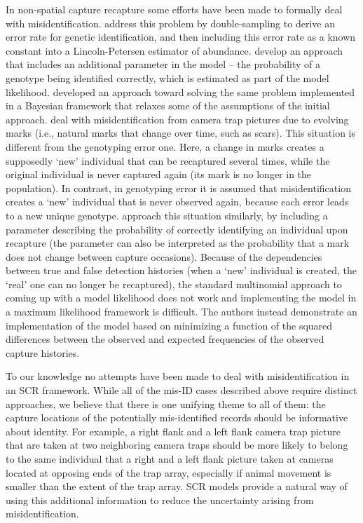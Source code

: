 In non-spatial capture recapture some efforts have been made to
formally deal with misidentification. \citet{stevick_etal:2001}
address this problem by double-sampling to derive an error rate for
genetic identification, and then including this error rate as a known
constant into a Lincoln-Petersen estimator of
abundance. \citet{lukacs_burnham:2005} develop an approach that
includes an additional parameter in the model -- the probability of a
genotype being identified correctly, which is estimated as part of the
model likelihood. \citet{link_etal:2010} developed an approach toward
solving the same problem implemented in a Bayesian framework that
relaxes some of the assumptions of the initial approach.
\citet{yoshizaki_etal:2009} deal with misidentification from camera
trap pictures due to evolving marks (i.e., natural marks that change
over time, such as scars). This situation is different from the
genotyping error one. Here, a change in marks creates a supposedly
`new' individual that can be recaptured several times, while the
original individual is never captured again (its mark is no longer in
the population). In contrast, in genotyping error it is assumed that
misidentification creates a `new' individual that is never observed
again, because each error leads to a new unique
genotype. \citet{yoshizaki_etal:2009} approach this situation
similarly, by including a parameter describing the probability of
correctly identifying an individual upon recapture (the parameter can
also be interpreted as the probability that a mark does not change
between capture occasions). Because of the dependencies between true
and false detection histories (when a `new' individual is created, the
`real' one can no longer be recaptured), the standard multinomial
approach to coming up with a model likelihood does not work and
implementing the model in a maximum likelihood framework is
difficult. The authors instead demonstrate an implementation of the
model based on minimizing a function of the squared differences
between the observed and expected frequencies of the observed capture
histories.

To our knowledge no attempts have been made to deal with
misidentification in an SCR framework. While all of the mis-ID cases
described above require distinct approaches, we believe that there is
one unifying theme to all of them: the capture locations of the %
potentially mis-identified records should be informative about
identity.  For example, a right flank and a left flank camera trap
picture that are taken at two neighboring camera traps should be %
more likely to belong to the same individual that a right and a left
flank picture taken at cameras located at opposing ends of the trap
array, especially if animal movement is smaller than the extent of the
trap array.  SCR models provide a natural way of using this additional
information to reduce the uncertainty arising from misidentification.

